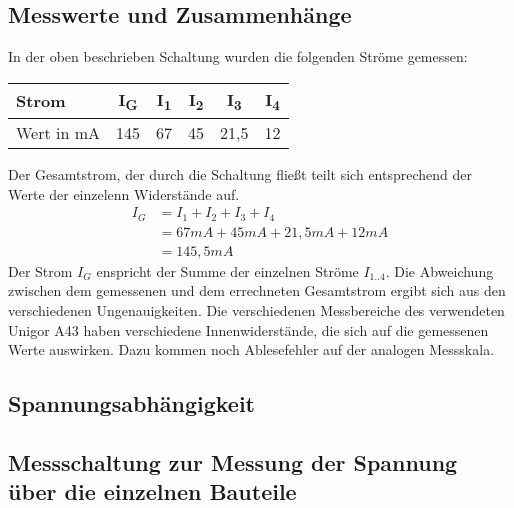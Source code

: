 \documentclass[
a4paper,     %
 headsepline, %
11pt         %
]{scrartcl}  %
\begin{document}
\subsection{Messwerte und Zusammenhänge}

In der oben beschrieben Schaltung wurden die folgenden Ströme gemessen:
\begin{center}
  \begin{tabular}{ l | c | c | c | c | c}
    \hline
    Strom      & I\textsubscript{G} & I\textsubscript{1} & I\textsubscript{2} & I\textsubscript{3} & I\textsubscript{4}  \\ \hline
    Wert in mA & 145 & 67 & 45 & 21,5 & 12 \\
    \hline
  \end{tabular}
\end{center}
Der Gesamtstrom, der durch die Schaltung fließt teilt sich entsprechend der Werte der einzelenn Widerstände auf.
\begin{align}
I_G &= I_1 + I_2 + I_3 + I_4 \nonumber \\
    &= 67mA + 45mA + 21,5mA + 12mA \nonumber \\
    &= 145,5 mA \nonumber
\end{align}
Der Strom $I_G$ enspricht der Summe der einzelnen Ströme $I_{1..4}$.\newline
Die Abweichung zwischen dem gemessenen und dem errechneten Gesamtstrom ergibt sich aus den verschiedenen Ungenauigkeiten. 
Die verschiedenen Messbereiche des verwendeten Unigor A43 haben verschiedene Innenwiderstände, die sich auf die gemessenen Werte auswirken. 
Dazu kommen noch Ablesefehler auf der analogen Messskala.

\subsection{Spannungsabhängigkeit}
\subsection{Messschaltung zur Messung der Spannung über die einzelnen Bauteile}
\end{document}
